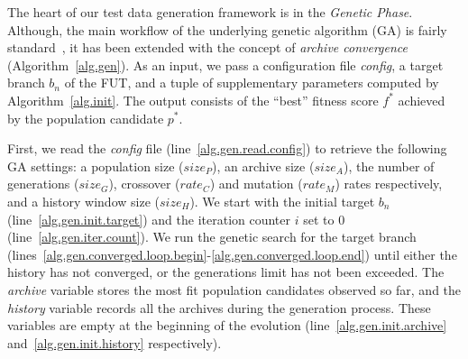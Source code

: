 The heart of our test data generation framework is in the \emph{Genetic Phase}. Although, the main workflow of the underlying genetic algorithm (GA) is fairly standard~\cite{poli2008field}, it has been extended with the concept of \emph{archive convergence} (Algorithm~\ref{alg.gen}). As an input, we pass a configuration file \emph{config}, a target branch $b_n$ of the FUT, and a tuple of supplementary parameters computed by Algorithm~\ref{alg.init}. The output consists of the ``best'' fitness score $f^*$ achieved by the population candidate $p^*$.

First, we read the \emph{config} file (line~\ref{alg.gen.read.config}) to retrieve the following GA settings: a population size  ($size_P$), an archive size ($size_A$), the number of generations ($size_G$), crossover ($rate_C$) and mutation ($rate_M$) rates respectively, and a history window size ($size_H$). We start with the initial target $b_n$ (line~\ref{alg.gen.init.target}) and the iteration counter $i$ set to 0 (line~\ref{alg.gen.iter.count}). We run the genetic search for the target branch (lines~\ref{alg.gen.converged.loop.begin}-\ref{alg.gen.converged.loop.end}) until either the history has not converged, or the generations limit has not been exceeded. The \emph{archive} variable stores the most fit population candidates observed so far, and the \emph{history} variable records all the archives during the generation process. These variables are empty at the beginning of the evolution (line~\ref{alg.gen.init.archive} and~\ref{alg.gen.init.history} respectively).

